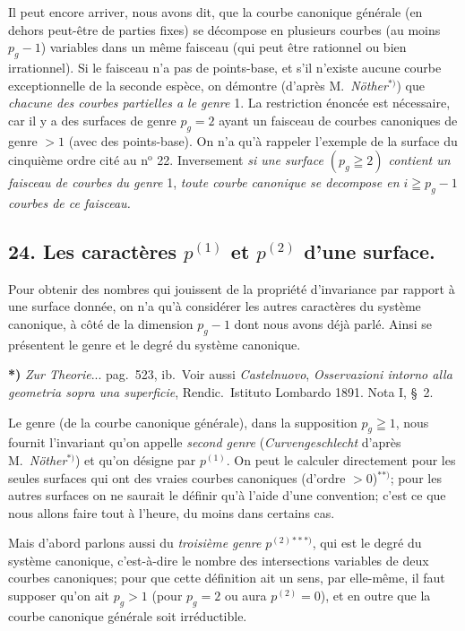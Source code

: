 \documentclass{article}
\begin{document}
Il peut encore arriver, nous avons dit, que la courbe canonique générale (en dehors peut-être de parties fixes) se décompose en plusieurs courbes (au moins $p_{g} - 1$) variables dans un même faisceau (qui peut être rationnel ou bien irrationnel). Si le faisceau n'a pas de points-base, et s'il n'existe aucune courbe exceptionnelle de la seconde espèce, on démontre (d'après M.\ \emph{Nöther}${}^{*)}$) que \emph{chacune des courbes partielles a le genre} 1. La restriction énoncée est nécessaire, car il y a des surfaces de genre $p_{g} = 2$ ayant un faisceau de courbes canoniques de genre $> 1$ (avec des points-base). On n'a qu'à rappeler l'exemple de la surface du cinquième ordre cité au n${}^{\text{o}}$ 22. Inversement \emph{si une surface $(p_{g} \geqq 2)$ contient un faisceau de courbes du genre} 1, \emph{toute courbe canonique se decompose en $i \geqq p_{g} - 1$ courbes de ce faisceau.}

\subsection*{24. Les caractères $p^{(1)}$ et $p^{(2)}$ d'une surface.}

Pour obtenir des nombres qui jouissent de la propriété d'invariance par rapport à une surface donnée, on n'a qu'à considérer les autres caractères du système canonique, à côté de la dimension $p_{g} - 1$ dont nous avons déjà parlé. Ainsi se présentent le genre et le degré du système canonique.

\textbf{*)} \emph{Zur Theorie}... pag.\ 523, ib.\ Voir aussi \emph{Castelnuovo}, \emph{Osservazioni intorno alla geometria sopra una superficie}, Rendic.\ Istituto Lombardo 1891. Nota I, §~2.


Le genre (de la courbe canonique générale), dans la supposition $p_{g} \geqq 1$, nous fournit l'invariant qu'on appelle \emph{second genre} (\emph{Curvengeschlecht} d'après M.\ \emph{Nöther}${}^{*)}$) et qu'on désigne par $p^{(1)}$. On peut le calculer directement pour les seules surfaces qui ont des vraies courbes canoniques (d'ordre $> 0$)${}^{**)}$; pour les autres surfaces on ne saurait le définir qu'à l'aide d'une convention; c'est ce que nous allons faire tout à l'heure, du moins dans certains cas.

Mais d'abord parlons aussi du \emph{troisième genre} $p^{(2)}$${}^{***)}$, qui est le degré du système canonique, c'est-à-dire le nombre des intersections variables de deux courbes canoniques; pour que cette définition ait un sens, par elle-même, il faut supposer qu'on ait $p_{g} > 1$ (pour $p_{g} = 2$ ou aura $p^{(2)} = 0$), et en outre que la courbe canonique générale soit irréductible.
\end{document}
